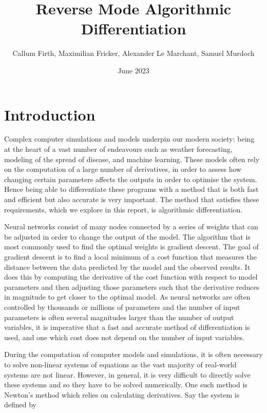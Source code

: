 \documentclass{article}
\title{Reverse Mode Algorithmic Differentiation}
\author{Callum Firth, Maximilian Fricker, Alexander Le Marchant, Samuel Murdoch} %
\date{June 2023}
\begin{document}
\maketitle

\tableofcontents

\section{Introduction}

Complex computer simulations and models underpin our modern society: being at the heart of a vast number of endeavours such as weather forecasting, modeling of the spread of disease, and machine learning. These models often rely on the computation of a large number of derivatives, in order to assess how changing certain parameters affects the outputs in order to optimise the system. Hence being able to differentiate these programs with a method that is both fast and efficient but also accurate is very important. The method that satisfies these requirements, which we explore in this report, is algorithmic differentiation.

Neural networks consist of many nodes connected by a series of weights that can be adjusted in order to change the output of the model. The algorithm that is most commonly used to find the optimal weights is gradient descent. The goal of gradient descent is to find a local minimum of a cost function that measures the distance between the data predicted by the model and the observed results. It does this by computing the derivative of the cost function with respect to model parameters and then adjusting those parameters such that the derivative reduces in magnitude to get closer to the optimal model. As neural networks are often controlled by thousands or millions of parameters and the number of input parameters is often several magnitudes larger than the number of output variables, it is imperative that a fast and accurate method of differentiation is used, and one which cost does not depend on the number of input variables.

During the computation of computer models and simulations, it is often necessary to solve non-linear systems of equations as the vast majority of real-world systems are not linear. However, in general, it is very difficult to directly solve these systems and so they have to be solved numerically. One such method is Newton's method which relies on calculating derivatives. Say the system is defined by
\end{document}
